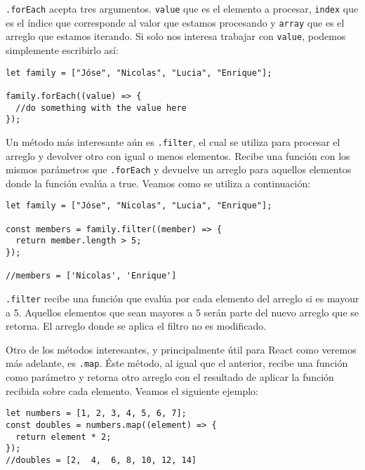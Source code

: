 \documentclass[a4paper, oneside, titlepage, 12pt]{book}
\begin{document}
\texttt{.forEach} acepta tres argumentos. \texttt{value} que es el elemento a procesar, \texttt{index} que es el índice que corresponde al valor que estamos procesando y \texttt{array} que es el arreglo que estamos iterando. Si solo nos interesa trabajar con \texttt{value}, podemos simplemente escribirlo así:

\begin{verbatim}
let family = ["Jóse", "Nicolas", "Lucia", "Enrique"];

family.forEach((value) => {
  //do something with the value here	
});
\end{verbatim}

Un método más interesante aún es \texttt{.filter}, el cual se utiliza para procesar el arreglo y devolver otro con igual o menos elementos. Recibe una función con los mismos parámetros que \texttt{.forEach} y devuelve un arreglo para aquellos elementos donde la función evalúa a true. Veamos como se utiliza a continuación:

\begin{verbatim}
let family = ["Jóse", "Nicolas", "Lucia", "Enrique"];

const members = family.filter((member) => {
  return member.length > 5;
});

//members = ['Nicolas', 'Enrique']
\end{verbatim}

\texttt{.filter} recibe una función que evalúa por cada elemento del arreglo si es mayour a 5. Aquellos elementos que sean mayores a 5 serán parte del nuevo arreglo que se retorna. El arreglo donde se aplica el filtro no es modificado.

Otro de los métodos interesantes, y principalmente útil para React como veremos más adelante, es \texttt{.map}. Éste método, al igual que el anterior, recibe una función como parámetro y retorna otro arreglo con el resultado de aplicar la función recibida sobre cada elemento. Veamos el siguiente ejemplo:

\begin{verbatim}
let numbers = [1, 2, 3, 4, 5, 6, 7];
const doubles = numbers.map((element) => {
  return element * 2;
});
//doubles = [2,  4,  6, 8, 10, 12, 14]
\end{verbatim}
\end{document}
